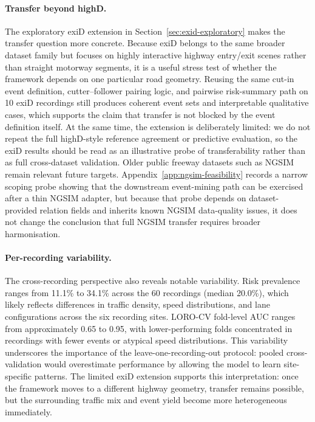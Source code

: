 \documentclass[12pt,a4paper,twoside,openright]{report}
\begin{document}
    \paragraph{Transfer beyond highD.} The exploratory exiD extension in Section~\ref{sec:exid-exploratory} makes the transfer question more concrete. Because exiD belongs to the same broader dataset family but focuses on highly interactive highway entry/exit scenes rather than straight motorway segments, it is a useful stress test of whether the framework depends on one particular road geometry. Reusing the same cut-in event definition, cutter--follower pairing logic, and pairwise risk-summary path on 10 exiD recordings still produces coherent event sets and interpretable qualitative cases, which supports the claim that transfer is not blocked by the event definition itself. At the same time, the extension is deliberately limited: we do not repeat the full highD-style reference agreement or predictive evaluation, so the exiD results should be read as an illustrative probe of transferability rather than as full cross-dataset validation. Older public freeway datasets such as NGSIM remain relevant future targets. Appendix~\ref{app:ngsim-feasibility} records a narrow scoping probe showing that the downstream event-mining path can be exercised after a thin NGSIM adapter, but because that probe depends on dataset-provided relation fields and inherits known NGSIM data-quality issues, it does not change the conclusion that full NGSIM transfer requires broader harmonisation.

    \paragraph{Per-recording variability.}
    The cross-recording perspective also reveals notable variability. Risk prevalence ranges from 11.1\% to 34.1\% across the 60 recordings (median 20.0\%), which likely reflects differences in traffic density, speed distributions, and lane configurations across the six recording sites. LORO-CV fold-level AUC ranges from approximately 0.65 to 0.95, with lower-performing folds concentrated in recordings with fewer events or atypical speed distributions. This variability underscores the importance of the leave-one-recording-out protocol: pooled cross-validation would overestimate performance by allowing the model to learn site-specific patterns. The limited exiD extension supports this interpretation: once the framework moves to a different highway geometry, transfer remains possible, but the surrounding traffic mix and event yield become more heterogeneous immediately.
\end{document}
